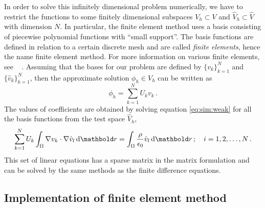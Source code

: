 In order to solve this infinitely dimensional problem numerically, we have to restrict the
functions to some finitely dimensional subspaces $V_h \subset V$ and $\hat V_h\subset\hat V$ with
dimension $N$. In particular, the finite element method uses a basis consisting of piecewise
polynomial functions with ``small support''. The basis functions are defined in relation
to a certain discrete mesh and are called {\em finite elements}, hence the name finite element
method. For more information on various finite elements, see \eg\ \citep{fenicsbook}
.
Assuming that the bases for our problem are defined by
 $\{v_k\}_{k=1}^N$ and $\{\hat v_k\}_{k=1}^N$, then the approximate
solution $\phi_h \in V_h$ can be written as
\begin{equation}
\phi_h = \sum_{k=1}^N U_k v_k\,.
\end{equation}
The values of coefficients are obtained by solving equation \eqref{eq:sim:weak} for all the
basis functions from the test space $\hat V_h$, \ie
\begin{equation}
\sum_{k=1}^N U_k\int_\Omega \nabla v_k\cdot\nabla \hat v_l\de\mb r =
 \int_\Omega\frac{\rho}{\epsilon_0} \hat v_l \de\mb r\,;\quad i=1,2,\ldots,N\,.
\end{equation}
This set of linear equations has a sparse matrix in the matrix formulation and can be solved
by the same methods as the finite difference equations.

\subsection{Implementation of finite element method}

